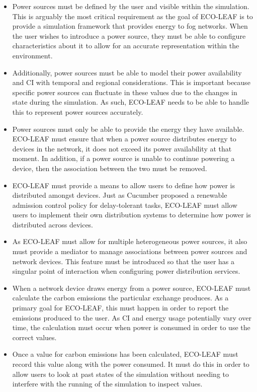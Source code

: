 \documentclass{l4proj}
\begin{document}
\begin{itemize}
    \item Power sources must be defined by the user and visible within the simulation. This is arguably the most critical requirement as the goal of ECO-LEAF is to provide a simulation framework that provides energy to fog networks. When the user wishes to introduce a power source, they must be able to configure characteristics about it to allow for an accurate representation within the environment.
    \item Additionally, power sources must be able to model their power availability and CI with temporal and regional considerations. This is important because specific power sources can fluctuate in these values due to the changes in state during the simulation. As such, ECO-LEAF needs to be able to handle this to represent power sources accurately.
    \item Power sources must only be able to provide the energy they have available. ECO-LEAF must ensure that when a power source distributes energy to devices in the network, it does not exceed its power availability at that moment. In addition, if a power source is unable to continue powering a device, then the association between the two must be removed.
    \item ECO-LEAF must provide a means to allow users to define how power is distributed amongst devices. Just as Cucumber \citep{cucumber} proposed a renewable admission control policy for delay-tolerant tasks, ECO-LEAF must allow users to implement their own distribution systems to determine how power is distributed across devices.
    \item As ECO-LEAF must allow for multiple heterogeneous power sources, it also must provide a mediator to manage associations between power sources and network devices. This feature must be introduced so that the user has a singular point of interaction when configuring power distribution services.
    \item When a network device draws energy from a power source, ECO-LEAF must calculate the carbon emissions the particular exchange produces. As a primary goal for ECO-LEAF, this must happen in order to report the emissions produced to the user. As CI and energy usage potentially vary over time, the calculation must occur when power is consumed in order to use the correct values.
    \item Once a value for carbon emissions has been calculated, ECO-LEAF must record this value along with the power consumed. It must do this in order to allow users to look at past states of the simulation without needing to interfere with the running of the simulation to inspect values.

\end{itemize}
\end{document}
